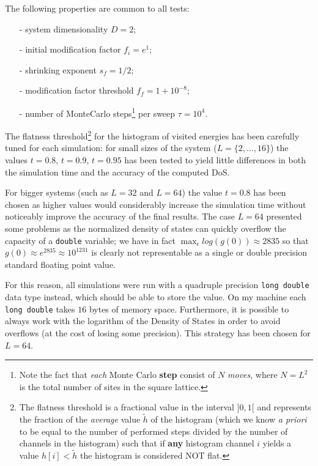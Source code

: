 \documentclass[11pt]{article}
\begin{document}
The following properties are common to all tests:
\begin{itemize}
	\item[-] system dimensionality $D = 2$;
	\item[-] initial modification factor $f_i = e^1$;
	\item[-] shrinking exponent $s_f= 1/2$;
	\item[-] modification factor threshold $f_f= 1 + 10^{-8}$;
	\item[-] number of MonteCarlo steps\footnote{Note the fact that {\em each} Monte Carlo {\bf step} consist of $N$ {\em moves}, where $N=L^2$ is the total number of sites in the square lattice.} per sweep $\tau = 10^4$.
\end{itemize}

The flatness threshold\footnote{The flatness threshold is a fractional value in the interval $]0,1[$ and represents the fraction of the {\em average} value $\tilde h$ of the histogram (which we know {\em a priori} to be equal to the number of performed steps divided by the number of channels in the histogram) such that if {\bf any} histogram channel $i$ yields a value $h[i] < \tilde h$ the histogram is considered NOT flat.}
for the histogram of visited energies has been carefully tuned for each simulation: for small sizes of the system ($L=\{2,...,16\}$) the values $t=0.8$, $t=0.9$, $t=0.95$ has been tested to yield little differences in both the simulation time and the accuracy of the computed DoS.

For bigger systems (such as $L=32$ and $L=64$) the value $t=0.8$ has been chosen as higher values would considerably increase the simulation time without noticeably improve the accuracy of the final results. The case $L=64$ presented some problems as the normalized density of states can quickly overflow the capacity of a \verb|double| variable; we have in fact $\max_\epsilon log(g(0)) \approx 2835$ so that $g(0) \approx e^{2835} \approx 10^{1231}$ is clearly not representable as a single or double precision standard floating point value.

For this reason, all simulations were run with a quadruple precision \verb|long double| data type instead, which should be able to store the value. On my machine each \verb|long double| takes $16$ bytes of memory space. Furthermore, it is possible to always work with the logarithm of the Density of States in order to avoid overflows (at the cost of losing some precision). This strategy has been chosen for $L=64$.
\end{document}
